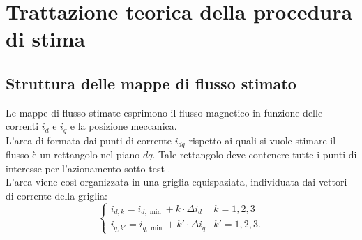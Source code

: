 \chapter{Trattazione teorica della procedura di stima}

\section{Struttura delle mappe di flusso stimato}
Le mappe di flusso stimate esprimono il flusso magnetico in funzione delle correnti $i_d$ e $i_q$ e la posizione meccanica.\\
L'area di formata dai punti di corrente $i_{dq}$ rispetto ai quali si vuole stimare il flusso è un rettangolo nel piano $dq$. Tale rettangolo deve contenere tutte i punti di interesse per l'azionamento sotto test \cite{Armando}.\\
L'area viene così organizzata in una griglia equispaziata, individuata dai vettori di corrente della griglia:
\begin{equation}
\begin{cases}
    i_{d,k} = i_{d,\min} + k \cdot \Delta i_d & k = 1, 2, 3 \\
    i_{q,k'} = i_{q,\min} + k' \cdot \Delta i_q & k' = 1, 2, 3.
\end{cases}
\end{equation}


